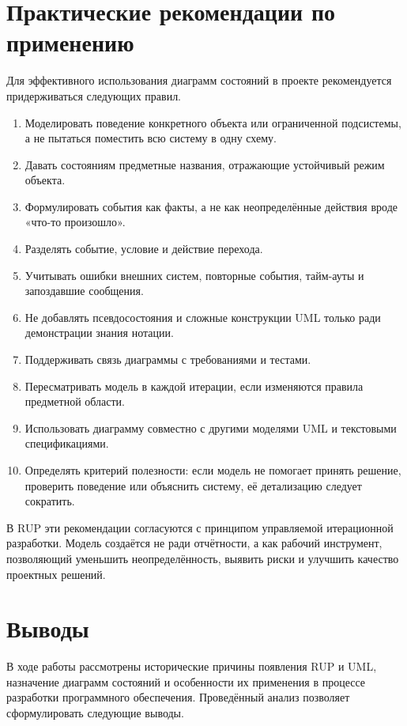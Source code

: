 \documentclass[essay,paper]{pmk-graduate}
\begin{document}
\section{Практические рекомендации по применению}

Для эффективного использования диаграмм состояний в проекте рекомендуется придерживаться следующих правил.

\begin{enumerate}
  \item Моделировать поведение конкретного объекта или ограниченной подсистемы, а не пытаться поместить всю систему в одну схему.
  \item Давать состояниям предметные названия, отражающие устойчивый режим объекта.
  \item Формулировать события как факты, а не как неопределённые действия вроде «что-то произошло».
  \item Разделять событие, условие и действие перехода.
  \item Учитывать ошибки внешних систем, повторные события, тайм-ауты и запоздавшие сообщения.
  \item Не добавлять псевдосостояния и сложные конструкции UML только ради демонстрации знания нотации.
  \item Поддерживать связь диаграммы с требованиями и тестами.
  \item Пересматривать модель в каждой итерации, если изменяются правила предметной области.
  \item Использовать диаграмму совместно с другими моделями UML и текстовыми спецификациями.
  \item Определять критерий полезности: если модель не помогает принять решение, проверить поведение или объяснить систему, её детализацию следует сократить.
\end{enumerate}

В RUP эти рекомендации согласуются с принципом управляемой итерационной разработки. Модель создаётся не ради отчётности, а как рабочий инструмент, позволяющий уменьшить неопределённость, выявить риски и улучшить качество проектных решений.

\section*{Выводы}

В ходе работы рассмотрены исторические причины появления RUP и UML, назначение диаграмм состояний и особенности их применения в процессе разработки программного обеспечения. Проведённый анализ позволяет сформулировать следующие выводы.
\end{document}
